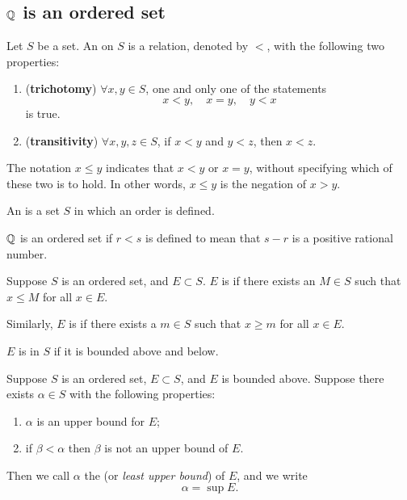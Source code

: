 \subsection{$\mathbb Q$ is an ordered set}
\begin{definition}
Let $S$ be a set. An  on $S$ is a relation, denoted by $<$, with the following two properties:
\begin{enumerate}[label=(\roman*)]
\item (\textbf{trichotomy}) $\forall x,y \in S$, one and only one of the statements
\[ x<y, \quad x=y, \quad y<x \]
is true.
\item (\textbf{transitivity}) $\forall x,y,z \in S$, if $x<y$ and $y<z$, then $x<z$.
\end{enumerate}
\end{definition}

\begin{notation}
The notation $x \le y$ indicates that $x<y$ or $x = y$, without specifying which of these two is to hold. In other words, $x\le y$ is the negation of $x>y$.
\end{notation}

\begin{definition}
An  is a set $S$ in which an order is defined.
\end{definition}

\begin{example}
$\mathbb Q$ is an ordered set if $r<s$ is defined to mean that $s-r$ is a positive rational number.
\end{example}

\begin{definition}
Suppose $S$ is an ordered set, and $E\subset S$. $E$ is  if there exists an  $M\in S$ such that $x \le M$ for all $x\in E$.

Similarly, $E$ is  if there exists a  $m\in S$ such that $x\ge m$ for all $x\in E$.

$E$ is  in $S$ if it is bounded above and below.
\end{definition}

\begin{definition}
Suppose $S$ is an ordered set, $E\subset S$, and $E$ is bounded above. Suppose there exists $\alpha\in S$ with the following properties:
\begin{enumerate}[label=(\roman*)]
\item $\alpha$ is an upper bound for $E$;
\item if $\beta<\alpha$ then $\beta$ is not an upper bound of $E$.
\end{enumerate}
Then we call $\alpha$ the  (or \emph{least upper bound}) of $E$, and we write
\[ \alpha=\sup E. \]
\end{definition}

